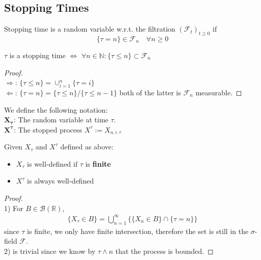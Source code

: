 \subsection{Stopping Times}
\begin{definition}
Stopping time is a random variable w.r.t. the filtration $(\mathcal{F}_t)_{t \ge 0}$ if 
	\begin{equation*}
		\{\tau = n \} \in \mathcal{F}_n \quad \forall n \geq 0
	\end{equation*}
\end{definition}

\begin{lemma}
	$\tau$ is a stopping time $\Leftrightarrow$ $ \forall n \in \mathbb{N}: \{\tau \leq n \} \subset \mathcal{F}_n$
\end{lemma}
\begin{proof}\quad\\
	$\Rightarrow$: $\{ \tau \leq n\} = \cup_{i = 1}^n \{\tau = i \}$\\
	$\Leftarrow$: $\{\tau = n\} = \{ \tau \leq n \} \slash \{ \tau \leq n-1 \}$ both of the latter is $\mathcal{F}_n$ measurable.
\end{proof}

\begin{remark}
We define the following notation:\\
$\mathbf{X_\tau}$: The random variable at time $\tau$.\\
$\mathbf{X^\tau}$: The stopped process $X^\tau:= X_{n \wedge \tau}$
\end{remark}

\begin{lemma}
	Given $X_\tau$ and $X^\tau$ defined as above:
	\begin{itemize}
		\item $X_\tau$ is well-defined if $\tau$ is \textbf{finite}
		\item $X^\tau$ is always well-defined
	\end{itemize}
\end{lemma}
\begin{proof}\quad\\
	1) For $B \in \mathcal{B}(\mathbb{R})$, 
	\begin{align*}
		\{X_\tau \in B \} = \bigcup_{n = 1}^\infty\bigg\{ \{X_n \in B\} \cap \{\tau = n\} \bigg\}
	\end{align*}
	since $\tau$ is finite, we only have finite intersection, therefore the set is still in the $\sigma$-field $\mathcal{F}$.\\
	2) is trivial since we know by $\tau \wedge n$ that the process is bounded.
\end{proof}




